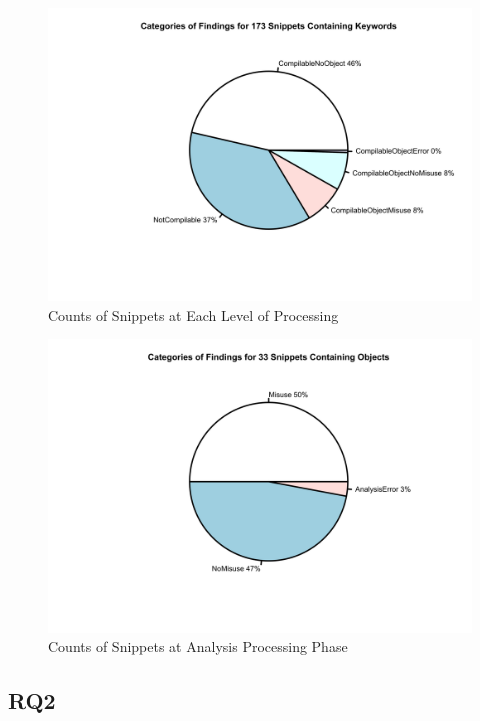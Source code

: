 \documentclass[10pt, conference]{IEEEtran}
\begin{document}
\begin{figure}[h]
\begin{center}
\includegraphics[width=1.0\linewidth]{PiePureMatchFull.png}
\caption{Counts of Snippets at Each Level of Processing}
\end{center}
\end{figure}

\begin{figure}[h]
\begin{center}
\includegraphics[width=0.9\linewidth]{PieObjOnly.png}
\caption{Counts of Snippets at Analysis Processing Phase}
\end{center}
\end{figure}


\subsection{RQ2}
\end{document}
